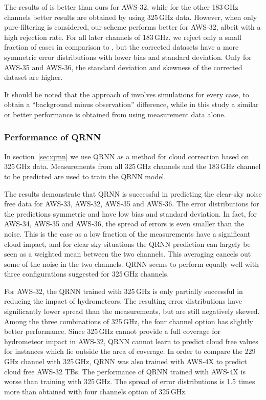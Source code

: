 \documentclass[12pt]{article}
\begin{document}
The results of \citet{rekha2012potential} is better than ours for AWS-32, while
for the other 183\,GHz channels better results are obtained by using 325\,GHz
data. However, when only pure-filtering is considered, our scheme performs
better for AWS-32, albeit with a high rejection rate. For all later channels of
183\,GHz, we reject only a small fraction of cases in comparison to
\citet{rekha2012potential}, but the corrected datasets have a more symmetric error
distributions with lower bias and standard deviation. Only for AWS-35 and AWS-36,
the standard deviation and skewness of the corrected dataset are higher.

It should be noted that the approach of \citet{rekha2012potential} involves
simulations for every case, to obtain a ``background minus observation''
difference, while in this study a similar or better performance is obtained
from using measurement data alone. 

\subsubsection{Performance of QRNN}
In section~\ref{sec:qrnn} we use QRNN as a method for cloud correction based on
325\,GHz data. Measurements from all 325\,GHz channels and the 183\,GHz channel
to be predicted are used to train the QRNN model.

The results demonstrate that QRNN is successful in predicting the clear-sky
noise free data for AWS-33, AWS-32, AWS-35 and AWS-36. The error distributions
for the predictions symmetric and have low bias and standard deviation. In
fact, for AWS-34, AWS-35 and AWS-36, the spread of errors is even smaller than
the noise. This is the case as a low fraction of the measurements have a
significant cloud impact, and for clear sky situations the QRNN prediction can
largely be seen as a weighted mean between the two channels. This averaging
cancels out some of the noise in the two channels. QRNN seems to perform
equally well with three configurations suggested for 325\,GHz channels.

For AWS-32, the QRNN trained with 325\,GHz is only partially successful in
reducing the impact of hydrometeors. The resulting error distributions have
significantly lower spread than the measurements, but are still negatively
skewed. Among the three combinations of 325\,GHz, the four channel option has
slightly better performance. Since 325\,GHz cannot provide a full coverage for
hydrometeor impact in AWS-32, QRNN cannot learn to predict cloud free values
for instances which lie outside the area of coverage. In order to compare the
229\,GHz channel with 325\,GHz, QRNN was also trained with AWS-4X to predict
cloud free AWS-32 TBs. The performance of QRNN trained with AWS-4X is worse
than training with 325\,GHz. The spread of error distributions is 1.5 times
more than obtained with four channels option of 325\,GHz.
\end{document}
